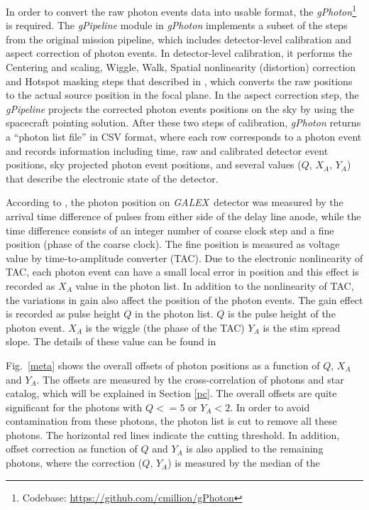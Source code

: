 \documentclass[12pt, preprint]{aastex}
\newcommand{\project}[1]{\textsl{#1}}
\newcommand{\galex}{\project{GALEX}}
\begin{document}
In order to convert the raw photon events data into usable format, the \project{gPhoton}\footnote{Codebase: \url{https://github.com/cmillion/gPhoton} } \citep[][]{gPhoton_code} is required.
The \project{gPipeline} module in \project{gPhoton} implements a subset of the steps from the original mission pipeline\citep{galex_cal}, which includes detector-level calibration and aspect correction of photon events.
In detector-level calibration, it performs the Centering and scaling, Wiggle, Walk, Spatial nonlinearity (distortion) correction and Hotspot masking steps that described in \cite{galex_cal}, which converts the raw positions to the actual source position in the focal plane.
In the aspect correction step, the \project{gPipeline} projects the corrected photon events positions on the sky by using the spacecraft pointing solution.
After these two steps of calibration, \project{gPhoton} returns a “photon list file” in CSV format, where each row corresponds to a photon event and records information including time, raw and calibrated detector event positions, sky projected photon event positions, and several values ($Q$, $X_A$, $Y_A$) that describe the electronic state of the detector.

According to \cite{galex_cal}, the photon position on \galex\ detector was measured by the arrival time difference of pulses from either side of the delay line anode, while the time difference consists of an integer number of coarse clock step and a fine position (phase of the coarse clock).
The fine position is measured as voltage value by time-to-amplitude converter (TAC).
Due to the electronic nonlinearity of TAC, each photon event can have a small local error in position and this effect is recorded as $X_A$ value in the photon list.
In addition to the nonlinearity of TAC, the variations in gain also affect the position of the photon events.
The gain effect is recorded as pulse height $Q$ in the photon list.
$Q$ is the pulse height of the photon event.
$X_A$ is the wiggle (the phase of the TAC)
$Y_A$ is the stim spread slope.
The details of these value can be found in \cite{galex_cal}

Fig.~\ref{meta} shows the overall offsets of photon positions as a function of $Q$, $X_A$ and $Y_A$.
The offsets are measured by the cross-correlation of photons and star catalog, which will be explained in Section \ref{pc}.
The overall offsets are quite significant for the photons with $Q<=5$ or $Y_A<2$.
In order to avoid contamination from these photons, the photon list is cut to remove all these photons.
The horizontal red lines indicate the cutting threshold.
In addition, offset correction as function of $Q$ and $Y_A$ is also applied to the remaining photons, where the correction ($Q$, $Y_A$) is measured by the median of the 
\end{document}
